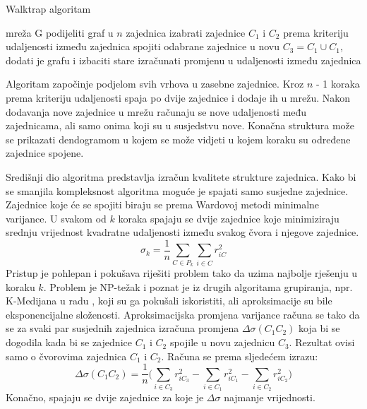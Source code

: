 \documentclass[times, utf8, diplomski]{fer}
\begin{document}
\begin{algorithm}
	\caption{Walktrap algoritam}
	\begin{algorithmic}[1]
		\REQUIRE mreža G
		\STATE podijeliti graf u $n$ zajednica
		\STATE izabrati zajednice $C_{1}$ i $C_{2}$ prema kriteriju udaljenosti između zajednica
		\STATE spojiti odabrane zajednice u novu $C_{3} = C_{1} \cup C_{1}$, dodati je grafu i izbaciti stare
		\STATE izračunati promjenu u udaljenosti između zajednica
		\ENDFOR		
	\end{algorithmic}
\end{algorithm}

Algoritam započinje podjelom svih vrhova u zasebne zajednice. Kroz $n$  - 1 koraka prema kriteriju udaljenosti spaja po dvije zajednice i dodaje ih u mrežu. Nakon dodavanja nove zajednice u mrežu računaju se nove udaljenosti među zajednicama, ali samo onima koji su u susjedstvu nove. Konačna struktura može se prikazati dendogramom u kojem se može vidjeti u kojem koraku su određene zajednice spojene.

Središnji dio algoritma predstavlja izračun kvalitete strukture zajednica. Kako bi se smanjila kompleksnost algoritma moguće je spajati samo susjedne zajednice. Zajednice koje će se spojiti biraju se prema Wardovoj metodi minimalne varijance. U svakom od $k$ koraka spajaju se dvije zajednice koje minimiziraju srednju vrijednost kvadratne udaljenosti između svakog čvora i njegove zajednice.
\begin{equation}
	\sigma_{k} = \frac{1}{n} \sum_{C \in P_{k}} \sum_{i \in C} r_{iC}^{2}
\end{equation}
Pristup je pohlepan i pokušava riješiti problem tako da uzima najbolje rješenju u koraku $k$. Problem je NP-težak i poznat je iz drugih algoritama grupiranja, npr. K-Medijana u radu \cite{de2003approximation}, koji su ga pokušali iskoristiti, ali aproksimacije su bile eksponencijalne složenosti. Aproksimacijska promjena varijance računa se tako da se za svaki par susjednih zajednica izračuna promjena $ \Delta \sigma (C_{1} C_{2})$ koja bi se dogodila kada bi se zajednice $C_{1}$ i $C_{2}$ spojile u novu zajednicu $C_{3}$. Rezultat ovisi samo o čvorovima zajednica $C_{1}$ i $C_{2}$. Računa se prema sljedećem izrazu:
\begin{equation}
	\Delta \sigma (C_{1} C_{2}) = \frac{1}{n} \bigg( \sum_{i \in C_{3}}r_{iC_{3}}^{2} - \sum_{i \in C_{1}}r_{iC_{1}}^{2} - \sum_{i \in C_{2}}r_{iC_{2}}^{2} \bigg)
\end{equation}
Konačno, spajaju se dvije zajednice za koje je $\Delta \sigma$ najmanje vrijednosti.
\end{document}
